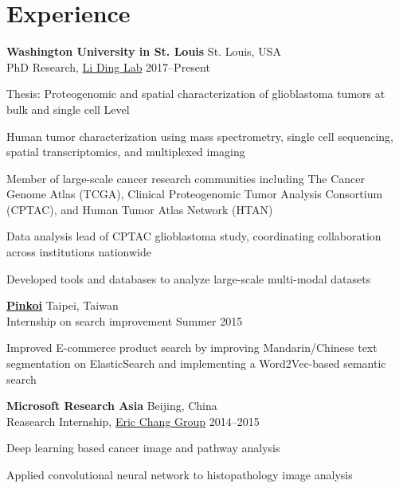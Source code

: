\section{Experience}

\begin{outerlist}

	\item \textbf{Washington University in St. Louis} \hfill St. Louis, USA\\
	PhD Research, \href{https://dinglab.wustl.edu/}{Li Ding Lab} \hfill
	2017--Present
	\begin{innerlist}
		\item Thesis: Proteogenomic and spatial characterization of glioblastoma tumors at bulk and single cell Level
		\item Human tumor characterization using mass spectrometry, single cell sequencing, spatial transcriptomics, and multiplexed imaging
		\item Member of large-scale cancer research communities including The Cancer Genome Atlas (TCGA), Clinical Proteogenomic Tumor Analysis Consortium (CPTAC), and Human Tumor Atlas Network (HTAN)
		\item Data analysis lead of CPTAC glioblastoma study, coordinating collaboration across institutions nationwide
		\item Developed tools and databases to analyze large-scale multi-modal datasets
	\end{innerlist}

	\item \href{http://pinkoi.com}{\textbf{Pinkoi}} \hfill Taipei, Taiwan\\
	Internship on search improvement \hfill
	Summer 2015
	\begin{innerlist}
		\item Improved E-commerce product search by improving Mandarin/Chinese text segmentation on ElasticSearch and implementing a Word2Vec-based semantic search
	\end{innerlist}

	\item \textbf{Microsoft Research Asia} \hfill Beijing, China\\
	Reasearch Internship, \href{https://www.microsoft.com/en-us/research/people/echang/}{Eric Chang Group} \hfill
	2014--2015
	\begin{innerlist}
		\item Deep learning based cancer image and pathway analysis
		\item Applied convolutional neural network to histopathology image analysis
	\end{innerlist}


\end{outerlist}
